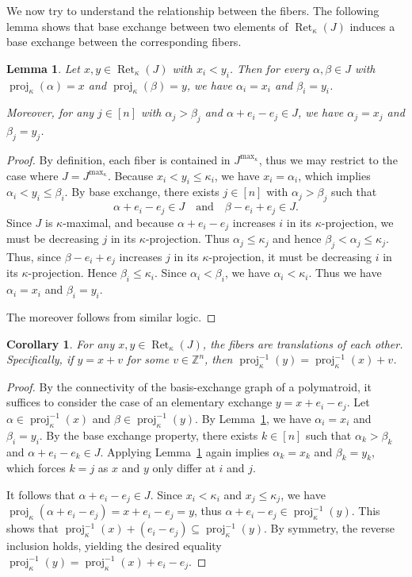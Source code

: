 \documentclass[10pt,a4paper]{amsart}
\newtheorem{lemma}[theorem]{Lemma}
\newtheorem{corollary}[theorem]{Corollary}
\DeclareMathOperator{\proj}{proj}              %
\newcommand{\kproj}{\proj_{\kappa}}            %
\DeclareMathOperator{\Ret}{Ret}                %
\newcommand{\RetK}{\Ret_{\kappa}}              %
\newcommand{\Jmax}{J^{\max_{\kappa}}}
\begin{document}
We now try to understand the relationship between the fibers. The following lemma shows that base exchange between two elements of $\RetK(J)$ induces a base exchange between the corresponding fibers.
\begin{lemma} \label{lemma:fiber_exchange_like_retraction}
    Let $x,y \in \RetK(J)$ with $x_i < y_i$. Then for every $\alpha,\beta \in J$ with $\kproj(\alpha) = x$ and $\kproj(\beta)= y$, we have $\alpha_i = x_i$ and $\beta_i = y_i$.

    Moreover, for any $j \in [n]$ with $\alpha_j > \beta_j$ and $\alpha+e_i -e_j \in J$, we have $\alpha_j = x_j$ and $\beta_j = y_j$.
\end{lemma}
\begin{proof}
    By definition, each fiber is contained in $\Jmax$, thus we may restrict to the case where $J = \Jmax$. Because $x_i < y_i \leq \kappa_i$, we have $x_i = \alpha_i$, which implies $\alpha_i < y_i \leq \beta_i$. By base exchange, there exists $j \in [n]$ with $\alpha_j > \beta_j$ such that \[
    \alpha + e_i -e_j \in J \quad \text{and} \quad \beta-e_i +e_j \in J.
    \]
    Since $J$ is $\kappa$-maximal, and because $\alpha+e_i -e_j$ increases $i$ in its $\kappa$-projection, we must be decreasing $j$ in its $\kappa$-projection. Thus $\alpha_j \leq \kappa_j$ and hence $\beta_j < \alpha_j \leq \kappa_j$. Thus, since $\beta -e_i +e_j$ increases $j$ in its $\kappa$-projection, it must be decreasing $i$ in its $\kappa$-projection. Hence $\beta_i \leq \kappa_i$. Since $\alpha_i < \beta_i$, we have $\alpha_i < \kappa_i$. Thus we have $\alpha_i = x_i$ and $\beta_i = y_i$.

    The moreover follows from similar logic.
\end{proof}

\begin{corollary} \label{corollary:fibers_are_translations}
    For any $x, y \in \RetK(J)$, the fibers are translations of each other. Specifically, if $y = x + v$ for some $v \in \mathbb{Z}^n$, then $\kproj^{-1}(y) = \kproj^{-1}(x) + v$.
\end{corollary}
\begin{proof}
    By the connectivity of the basis-exchange graph of a polymatroid, it suffices to consider the case of an elementary exchange $y = x + e_i - e_j$. Let $\alpha \in \kproj^{-1}(x)$ and $\beta \in \kproj^{-1}(y)$. By Lemma~\ref{lemma:fiber_exchange_like_retraction}, we have $\alpha_i = x_i$ and $\beta_i = y_i$. By the base exchange property, there exists $k \in [n]$ such that $\alpha_k > \beta_k$ and $\alpha + e_i - e_k \in J$. Applying Lemma~\ref{lemma:fiber_exchange_like_retraction} again implies $\alpha_k = x_k$ and $\beta_k = y_k$, which forces $k = j$ as $x$ and $y$ only differ at $i$ and $j$.

    It follows that $\alpha + e_i - e_j \in J$. Since $x_i < \kappa_i$ and $x_j \leq \kappa_j$, we have $\kproj(\alpha + e_i - e_j) = x + e_i - e_j = y$, thus $\alpha + e_i - e_j \in \kproj^{-1}(y)$. This shows that $\kproj^{-1}(x) + (e_i - e_j) \subseteq \kproj^{-1}(y)$. By symmetry, the reverse inclusion holds, yielding the desired equality $
        \kproj^{-1}(y) = \kproj^{-1}(x) + e_i - e_j.$
\end{proof}
\end{document}

